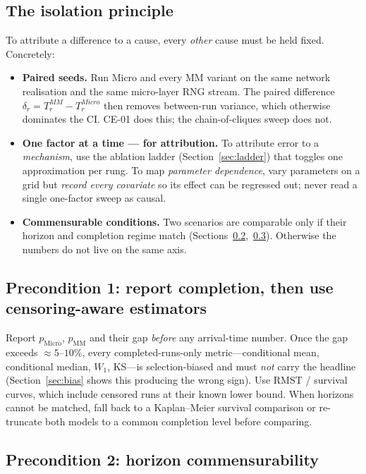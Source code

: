 \documentclass[11pt,a4paper]{article}
\begin{document}
\subsection{The isolation principle}

To attribute a difference to a cause, every \emph{other} cause must be held
fixed.  Concretely:
\begin{itemize}
  \item \textbf{Paired seeds.}  Run Micro and every MM variant on the same
        network realisation and the same micro-layer RNG stream.  The paired
        difference $\delta_r = T_r^{MM}-T_r^{Micro}$ then removes between-run
        variance, which otherwise dominates the CI.  CE-01 does this; the
        chain-of-cliques sweep does not.
  \item \textbf{One factor at a time --- for attribution.}  To attribute error
        to a \emph{mechanism}, use the ablation ladder (Section~\ref{sec:ladder})
        that toggles one approximation per rung.  To map \emph{parameter
        dependence}, vary parameters on a grid but \emph{record every covariate}
        so its effect can be regressed out; never read a single one-factor sweep
        as causal.
  \item \textbf{Commensurable conditions.}  Two scenarios are comparable only if
        their horizon and completion regime match
        (Sections~\ref{sec:cens},~\ref{sec:horizon}).  Otherwise the numbers do
        not live on the same axis.
\end{itemize}

\subsection{Precondition 1: report completion, then use censoring-aware estimators}
\label{sec:cens}

Report $p_{\mathrm{Micro}}$, $p_{\mathrm{MM}}$ and their gap \emph{before} any
arrival-time number.  Once the gap exceeds $\approx 5$--$10\%$, every
completed-runs-only metric---conditional mean, conditional median, $W_1$,
KS---is selection-biased and must \emph{not} carry the headline
(Section~\ref{sec:bias} shows this producing the wrong sign).  Use RMST /
survival curves, which include censored runs at their known lower bound.  When
horizons cannot be matched, fall back to a Kaplan--Meier survival comparison or
re-truncate both models to a common completion level before comparing.

\subsection{Precondition 2: horizon commensurability}
\label{sec:horizon}
\end{document}
